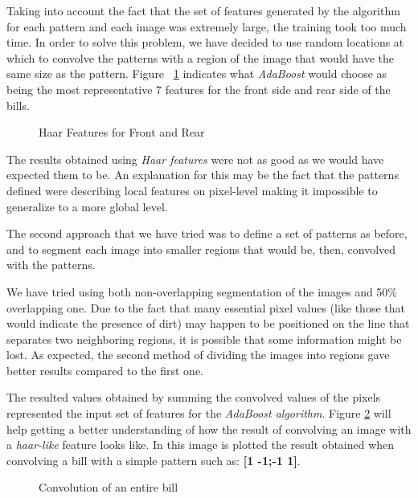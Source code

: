 \documentclass[11pt,twocolumn]{article}
\begin{document}
			Taking into account the fact that the set of features generated by the algorithm for each pattern and each image was extremely large, the training took too much time. In order to solve this problem, we have decided to use random locations at which to convolve the patterns with a region of the image that would have the same size as the pattern. Figure~ \ref{Haar_features} indicates what \emph{AdaBoost} would choose as being the most representative 7 features for the front side and rear side of the bills.

			\begin{figure}[!hbtp]
				\centering
				\caption{Haar Features for Front and Rear}
				\label{Haar_features}
			\end{figure}

			The results obtained using \emph{Haar features} were not as	good as we would have expected them to be. An explanation for this may be the fact that the patterns defined were describing local features on pixel-level making it impossible to generalize to a more global level.
			
			The second approach that we have tried was to define a set of patterns as before, and to segment each image into smaller regions that would be, then, convolved with the patterns.
			
			We have tried using both non-overlapping segmentation of the images and 50\% overlapping one. Due to the fact that many essential pixel values (like those that would indicate the presence of dirt) may happen to be positioned on the line that separates two neighboring regions, it is possible that some information might be lost. As expected, the second method of dividing the images into regions gave better results compared to the first one.

			The resulted values obtained by summing the convolved values of the pixels represented the input set of features for the \emph{AdaBoost algorithm}. Figure \ref{convolved} will help getting a better understanding of how the result of convolving an image with a \emph{haar-like} feature looks like. In this image is plotted the result obtained when convolving a bill with a simple pattern such as: \textbf{[1 -1;-1 1]}.

			\begin{figure}[!hbtp]
				\centering
				\caption{Convolution of an entire bill}
				\label{convolved}
			\end{figure}
\end{document}
